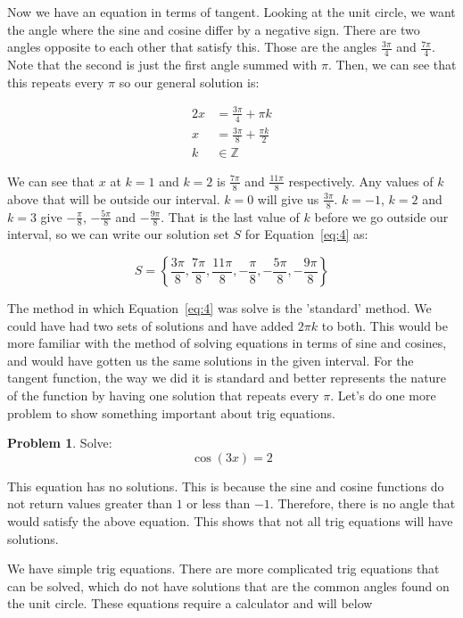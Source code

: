 \documentclass[12pt]{article}
\theoremstyle{definition}
\newtheorem{problem}{Problem}
\begin{document}
Now we have an equation in terms of tangent.
Looking at the unit circle, we want the angle where the sine and cosine differ by a negative sign.
There are two angles opposite to each other that satisfy this.
Those are the angles $\frac{3\pi}{4}$ and $\frac{7\pi}{4}$.
Note that the second is just the first angle summed with $\pi$.
Then, we can see that this repeats every $\pi$ so our general solution is:

\begin{align}
    2x & = \frac{3\pi}{4} + \pi k           \\
    x  & = \frac{3\pi}{8} + \frac{\pi k}{2} \\
    k  & \in \mathbb{Z}
\end{align}

We can see that $x$ at $k=1$ and $k=2$ is $\frac{7\pi}{8}$ and $\frac{11\pi}{8}$ respectively.
Any values of $k$ above that will be outside our interval.
$k=0$ will give us $\frac{3\pi}{8}$.
$k=-1$, $k=2$ and $k=3$ give $-\frac{\pi}{8}$, $-\frac{5\pi}{8}$ and $-\frac{9\pi}{8}$.
That is the last value of $k$ before we go outside our interval, so we can write our solution set $S$ for Equation~\eqref{eq:4} as:

\begin{equation}
    S = \left\{ \frac{3\pi}{8}, \frac{7\pi}{8}, \frac{11\pi}{8}, -\frac{\pi}{8}, -\frac{5\pi}{8}, -\frac{9\pi}{8} \right\}
\end{equation}

The method in which Equation~\eqref{eq:4} was solve is the 'standard' method.
We could have had two sets of solutions and have added $2\pi k$ to both.
This would be more familiar with the method of solving equations in terms of sine and cosines, and would have gotten us the same solutions in the given interval.
For the tangent function, the way we did it is standard and better represents the nature of the function by having one solution that repeats every $\pi$.
Let's do one more problem to show something important about trig equations.


\begin{problem}
Solve:
\begin{equation*}
    \cos(3x) = 2 \label{eq:5}
\end{equation*}
\end{problem}

This equation has no solutions.
This is because the sine and cosine functions do not return values greater than $1$ or less than $-1$.
Therefore, there is no angle that would satisfy the above equation.
This shows that not all trig equations will have solutions.

We have simple trig equations.
There are more complicated trig equations that can be solved, which do not have solutions that are the common angles found on the unit circle.
These equations require a calculator and will below
\end{document}
